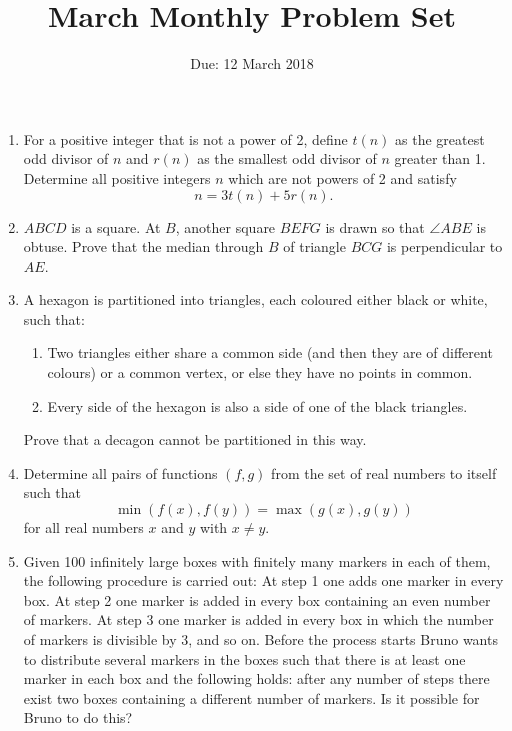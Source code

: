 \documentclass[12pt]{article}
\title{\vspace{-12pt}March Monthly Problem Set}
\author{Due: 12 March 2018}
\date{}
\begin{document}
 \maketitle \pagestyle{empty}

\begin{enumerate}

\item %
For a positive integer that is not a power of 2, define $t(n)$ as the greatest odd divisor of $n$ and $r(n)$ as the smallest odd divisor of $n$ greater than 1. Determine all positive integers $n$ which are not powers of 2 and satisfy
	\[ n = 3t(n)+5r(n).\]


\item %
$ABCD$ is a square. At $B$, another square $BEFG$ is drawn so that $\angle ABE$ is obtuse. Prove that the median through $B$ of triangle $BCG$ is perpendicular to $AE$.


\item %
A hexagon is partitioned into triangles, each coloured either black or white, such that:
\begin{enumerate}
\item Two triangles either share a common side (and then they are of different colours) or a common vertex, or else they have no points in common.
\item Every side of the hexagon is also a side of one of the black triangles.
\end{enumerate}
Prove that a decagon cannot be partitioned in this way.


\item %
Determine all pairs of functions $(f,g)$ from the set of real numbers to itself such that
\[ \min(f(x),f(y)) = \max(g(x),g(y)) \]
for all real numbers $x$ and $y$ with $x \neq y$.


\item %
Given 100 infinitely large boxes with finitely many markers in each of them, the following procedure is carried out: At step 1 one adds one marker in every box. At step 2 one marker is added in every box containing an even number of markers. At step 3 one marker is added in every box in which the number of markers is divisible by 3, and so on. Before the process starts Bruno wants to distribute several markers in the boxes such that there is at least one marker in each box and the following holds: after any number of steps there exist two boxes containing a different number of markers. Is it possible for Bruno to do this?



\end{enumerate}
\end{document}
